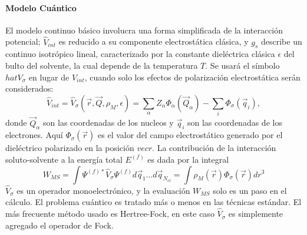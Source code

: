 
\paragraph{Modelo Cu\'antico}
El modelo continuo b\'asico involucra una forma simplificada de la
interacci\'on potencial; $\hat V_{int}$ es reducido a su componente
electrost\'atica cl\'asica, y $g_s$ describe un continuo isotr\'opico
lineal, caracterizado por la constante diel\'ectrica cl\'asica 
$\epsilon$ del bulto del solvente, la cual depende de la temperatura 
$T$. Se usar\'a el s\'imbolo $hat V_{\sigma}$ en lugar de 
$\hat V_{int}$, cuando solo los efectos de polarizaci\'on 
electrost\'atica ser\'an considerados:
$$\hat V_{int}=\hat V_{\sigma}(\vec r,\vec Q,\rho_M,\epsilon)=
\sum_{\alpha}Z_{\alpha}\Phi_{\alpha}(\vec Q_{\alpha})-\sum_i
\Phi_{\sigma}(\vec q_i),$$
donde $\vec Q_{\alpha}$ son las coordenadas de los nucleos y 
$\vec q_i$ son las coordenadas de los electrones. Aqu\'i 
$\Phi_{\sigma}(\vec r)$ es el valor del campo electrost\'atico 
generado por el diel\'ectrico polarizado en la posici\'on $vec r$. La
contribuci\'on de la interacci\'on soluto-solvente a la energ\'ia 
total $E^{(f)}$ es dada por la integral
$$W_{MS}=\int \Psi^{(f)*}\hat V_{\sigma}\Psi^{(f)}d\vec q_1...
d\vec q_{N_{el}}=\int\rho_M(\vec r)\Phi_{\sigma}(\vec r)dr^3$$
$\hat V_{\sigma}$ es un operador monoelectr\'onico, y la evaluaci\'on
$W_{MS}$ solo es un paso en el c\'alculo. El problema cu\'antico es
tratado m\'as o menos en las t\'ecnicas est\'andar. El m\'as 
frecuente m\'etodo usado es Hertree-Fock, en este caso 
$\hat V_{\sigma}$ es simplemente agregado el operador de Fock.
